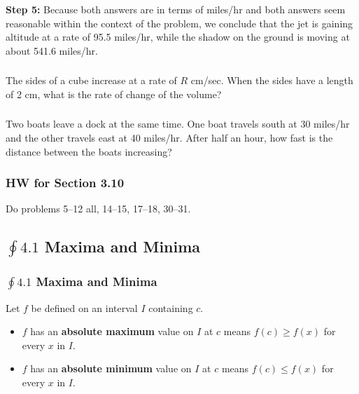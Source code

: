 \documentclass[14pt]{beamer}
\begin{document}
\begin{frame}
\frametitle{}
{\bf Step 5:}  Because both answers are in terms of miles/hr and both answers seem reasonable within the context of the problem, we conclude that the jet is gaining altitude at a rate of 95.5 miles/hr, while the shadow on the ground is moving at about 541.6 miles/hr.
\end{frame}

\begin{frame}%
\frametitle{}
\begin{ex} The sides of a cube increase at a rate of $R$ cm/sec.  When the sides have a length of 2 cm, what is the rate of change of the volume? \end{ex}
\end{frame}

\begin{frame}%
\frametitle{}
\begin{ex} Two boats leave a dock at the same time.  One boat travels south at 30 miles/hr and the other travels east at 40 miles/hr.  After half an hour, how fast is the distance between the boats increasing? \end{ex}
\end{frame}

\begin{frame}
\frametitle{HW for Section 3.10}
Do problems 5--12 all, 14--15, 17--18, 30--31.
\end{frame}

\begin{frame}
\subsection[$\oint 4.1$ Maxima and Minima]{$\oint 4.1$ Maxima and Minima}
\frametitle{$\oint 4.1$ Maxima and Minima}
\small 
\begin{dfn} Let $f$ be defined on an interval $I$ containing $c$.
\begin{itemize}
\item $f$ has an {\bf absolute maximum} value on $I$ at $c$ means $f(c)\ge f(x)$ for every $x$ in $I$.
\item $f$ has an {\bf absolute minimum} value on $I$ at $c$ means $f(c)\le f(x)$ for every $x$ in $I$.
\end{itemize}
\end{dfn}
\end{frame}
\end{document}
